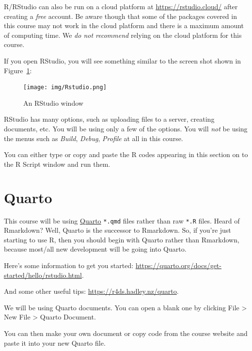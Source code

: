 \documentclass[
  letterpaper,
  DIV=11,
  numbers=noendperiod]{scrreprt}
\begin{document}
R/RStudio can also be run on a cloud platform at
\url{https://rstudio.cloud/} after creating a \emph{free} account. Be
aware though that some of the packages covered in this course may not
work in the cloud platform and there is a maximum amount of computing
time. We \emph{do not recommend} relying on the cloud platform for this
course.

If you open RStudio, you will see something similar to the screen shot
shown in Figure~\ref{fig-rstud}:

\begin{figure}

{\centering \texttt{[image: img/Rstudio.png]}

}

\caption{\label{fig-rstud}An RStudio window}

\end{figure}

RStudio has many options, such as uploading files to a server, creating
documents, etc. You will be using only a few of the options. You will
\emph{not} be using the menus such as \emph{Build}, \emph{Debug},
\emph{Profile} at all in this course.

You can either type or copy and paste the R codes appearing in this
section on to the R Script window and run them.

\hypertarget{quarto}{%
\chapter*{Quarto}\label{quarto}}

This course will be using \href{https://quarto.org/}{Quarto}
\texttt{*.qmd} files rather than raw \texttt{*.R} files. Heard of
Rmarkdown? Well, Quarto is the successor to Rmarkdown. So, if you're
just starting to use R, then you should begin with Quarto rather than
Rmarkdown, because most/all new development will be going into Quarto.

Here's some information to get you started:
\url{https://quarto.org/docs/get-started/hello/rstudio.html}.

And some other useful tips: \url{https://r4ds.hadley.nz/quarto}.

We will be using Quarto documents. You can open a blank one by clicking
File \textgreater{} New File \textgreater{} Quarto Document.

You can then make your own document or copy code from the course website
and paste it into your new Quarto file.
\end{document}
